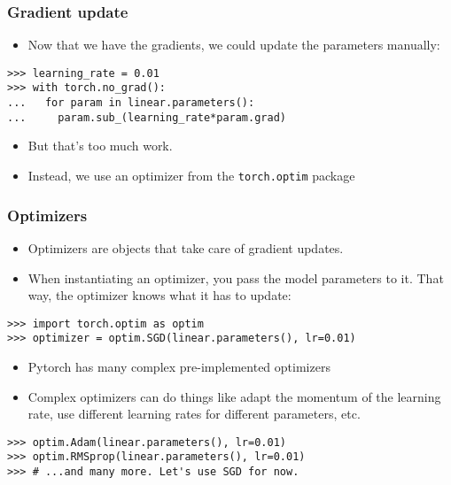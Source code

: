 \begin{frame}[fragile]
\frametitle{Gradient update}
\vfill
\begin{itemize}
\item Now that we have the gradients, we could update the parameters manually:
\end{itemize}
\begin{verbatim}
>>> learning_rate = 0.01
>>> with torch.no_grad():
...   for param in linear.parameters():
...     param.sub_(learning_rate*param.grad)
\end{verbatim}
\begin{itemize}
\item But that's too much work.
\item Instead, we use an optimizer from the \texttt{torch.optim} package
\end{itemize}
\end{frame}

\begin{frame}[fragile]
\frametitle{Optimizers}
\vfill
\begin{itemize}
\item Optimizers are objects that take care of gradient updates.
\item When instantiating an optimizer, you pass the model parameters to it. That way, the optimizer knows what it has to update:
\end{itemize}
\begin{verbatim}
>>> import torch.optim as optim
>>> optimizer = optim.SGD(linear.parameters(), lr=0.01)
\end{verbatim}
\begin{itemize}
\item Pytorch has many complex pre-implemented optimizers
\item Complex optimizers can do things like adapt the momentum of the learning rate, use different learning rates for different parameters, etc.
\end{itemize}
\begin{verbatim}
>>> optim.Adam(linear.parameters(), lr=0.01)
>>> optim.RMSprop(linear.parameters(), lr=0.01)
>>> # ...and many more. Let's use SGD for now.
\end{verbatim}
\end{frame}
	
